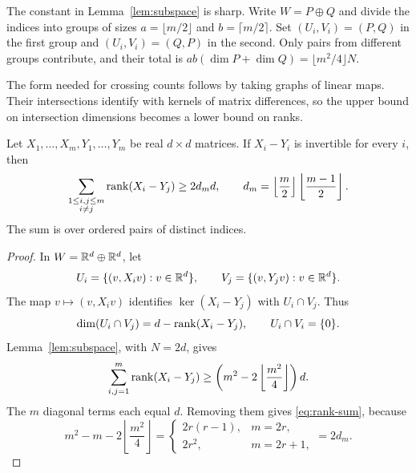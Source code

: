 \begin{remark}
The constant in Lemma~\ref{lem:subspace} is sharp.  Write $W=P\oplus Q$
and divide the indices into groups of sizes $a=\lfloor m/2\rfloor$ and
$b=\lceil m/2\rceil$.  Set $(U_i,V_i)=(P,Q)$ in the first group and
$(U_i,V_i)=(Q,P)$ in the second.  Only pairs from different groups
contribute, and their total is $ab(\dim P+\dim Q)=\lfloor m^2/4\rfloor N$.
\end{remark}

The form needed for crossing counts follows by taking graphs of linear
maps.  Their intersections identify with kernels of matrix differences, so the
upper bound on intersection dimensions becomes a lower bound on ranks.

\begin{corollary}
\label{cor:rank-sum}
Let $X_1,\ldots,X_m,Y_1,\ldots,Y_m$ be real $d\times d$ matrices.
If $X_i-Y_i$ is invertible for every $i$, then
\begin{equation}
\label{eq:rank-sum}
  \sum_{\substack{1\leq i,j\leq m\\i\ne j}}
       \operatorname{rank}(X_i-Y_j)\geq2d_m d,
  \qquad
  d_m=\left\lfloor\frac m2\right\rfloor
      \left\lfloor\frac{m-1}{2}\right\rfloor.
\end{equation}
The sum is over ordered pairs of distinct indices.
\end{corollary}

\begin{proof}
In $W=\mathbb R^d\oplus\mathbb R^d$, let
\[
  U_i=\{(v,X_iv):v\in\mathbb R^d\},\qquad
  V_j=\{(v,Y_jv):v\in\mathbb R^d\}.
\]
The map $v\mapsto(v,X_iv)$ identifies $\ker(X_i-Y_j)$ with
$U_i\cap V_j$.  Thus
\[
  \dim(U_i\cap V_j)=d-\operatorname{rank}(X_i-Y_j),
  \qquad U_i\cap V_i=\{0\}.
\]
Lemma~\ref{lem:subspace}, with $N=2d$, gives
\[
  \sum_{i,j=1}^{m}\operatorname{rank}(X_i-Y_j)
  \geq\left(m^2-2\left\lfloor\frac{m^2}{4}\right\rfloor\right)d.
\]
The $m$ diagonal terms each equal $d$.  Removing them gives
\eqref{eq:rank-sum}, because
\[
  m^2-m-2\left\lfloor\frac{m^2}{4}\right\rfloor
  =\begin{cases}
      2r(r-1),&m=2r,\\
      2r^2,&m=2r+1,
    \end{cases}
  =2d_m.
\]
\end{proof}
